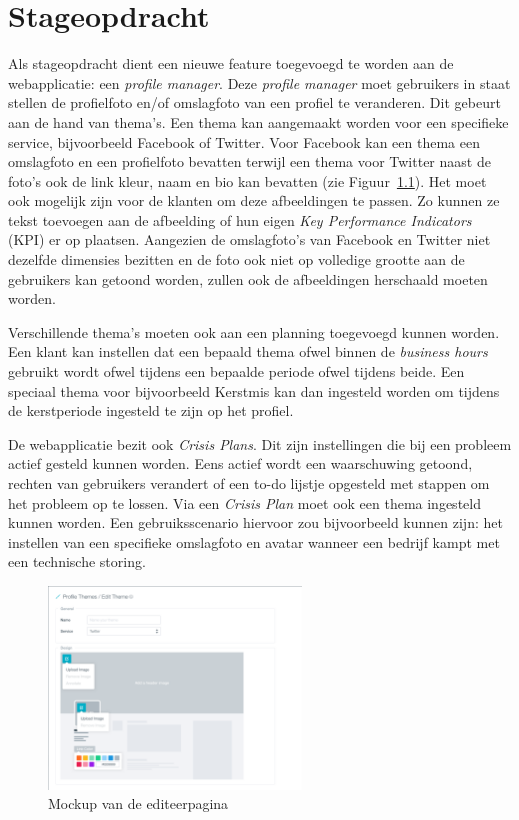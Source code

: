
\iffalse
\chapter{Stageopdracht}
\vspace{-3cm}
Als stageopdracht dient een nieuwe feature toegevoegd te worden aan de webapplicatie: een \textit{profile manager}. Deze \textit{profile manager} moet gebruikers in staat stellen de profielfoto en/of omslagfoto van een profiel te veranderen. Dit gebeurt aan de hand van thema's. Een thema kan aangemaakt worden voor een specifieke service, bijvoorbeeld Facebook of Twitter. Voor Facebook kan een thema een omslagfoto en een profielfoto bevatten terwijl een thema voor Twitter naast de foto's ook de link kleur, naam en bio kan bevatten (zie Figuur~\ref{fig:EditTheme}). Het moet ook mogelijk zijn voor de klanten om deze afbeeldingen te passen. Zo kunnen ze tekst toevoegen aan de afbeelding of hun eigen \textit{Key Performance Indicators} (KPI) er op plaatsen. Aangezien de omslagfoto's van Facebook en Twitter niet dezelfde dimensies bezitten en de foto ook niet op volledige grootte aan de gebruikers kan getoond worden, zullen ook de afbeeldingen herschaald moeten worden.

Verschillende thema's moeten ook aan een planning toegevoegd kunnen worden. Een klant kan instellen dat een bepaald thema ofwel binnen de \textit{business hours} gebruikt wordt ofwel tijdens een bepaalde periode ofwel tijdens beide. Een speciaal thema voor bijvoorbeeld Kerstmis kan dan ingesteld worden om tijdens de kerstperiode ingesteld te zijn op het profiel. 

De webapplicatie bezit ook \textit{Crisis Plans}. Dit zijn instellingen die bij een probleem actief gesteld kunnen worden. Eens actief wordt een waarschuwing getoond, rechten van gebruikers verandert of een to-do lijstje opgesteld met stappen om het probleem op te lossen. Via een \textit{Crisis Plan} moet ook een thema ingesteld kunnen worden. Een gebruiksscenario hiervoor zou bijvoorbeeld kunnen zijn: het instellen van een specifieke omslagfoto en avatar wanneer een bedrijf kampt met een technische storing. 

\begin{figure}[H]
	\centering
	\includegraphics[width=0.6\textwidth]{Figuren/EditThemeMockup.png}
	\caption{Mockup van de editeerpagina \cite{EditThemeMockup}} %
	\label{fig:EditTheme}
\end{figure} 

